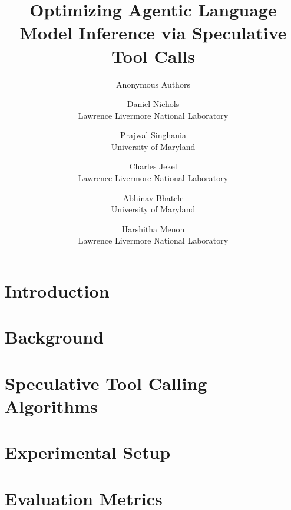 \documentclass[letterpaper,twocolumn,10pt,dvipsnames]{article}
\begin{document}
\date{}

\title{\Large \bf Optimizing Agentic Language Model Inference via Speculative Tool Calls} %

\author{
{\rm Anonymous Authors}\\
} %

\author{
    {\rm Daniel Nichols}\\
    Lawrence Livermore National Laboratory
    \and
    {\rm Prajwal Singhania}\\
    University of Maryland
    \and
    {\rm Charles Jekel}\\
    Lawrence Livermore National Laboratory
    \and
    {\rm Abhinav Bhatele}\\
    University of Maryland
    \and
    {\rm Harshitha Menon}\\
    Lawrence Livermore National Laboratory
}

\maketitle

\begin{abstract}

\end{abstract}


\section{Introduction}\label{sec:intro}


\section{Background}\label{sec:bg}



\section{Speculative Tool Calling Algorithms}\label{sec:methodology}



\section{Experimental Setup}\label{sec:setup}


\section{Evaluation Metrics}\label{sec:metrics}

\end{document}

